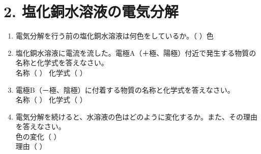 \section*{2. 塩化銅水溶液の電気分解}
\begin{enumerate}
    \item 電気分解を行う前の塩化銅水溶液は何色をしているか。（ \hspace{4cm} ）色
    \item 塩化銅水溶液に電流を流した。電極A（＋極、陽極）付近で発生する物質の名称と化学式を答えなさい。\\[0.2cm]
    名称（ \hspace{4cm} ） \hspace{1cm} 化学式（ \hspace{4cm} ）
    \item 電極B（－極、陰極）に付着する物質の名称と化学式を答えなさい。\\[0.2cm]
    名称（ \hspace{4cm} ） \hspace{1cm} 化学式（ \hspace{4cm} ）
    \item 電気分解を続けると、水溶液の色はどのように変化するか。また、その理由を答えなさい。\\[0.2cm]
    色の変化（ \hspace{12cm} ）\\[0.2cm]
    理由（ \hspace{13cm} ）
\end{enumerate}
